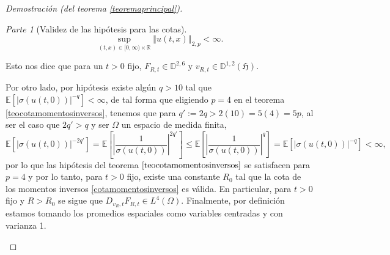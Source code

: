 \documentclass[letterpaper,twoside,12pt]{book}
\newcommand{\R}{\mathbb{R}}
\newcommand{\D}{\mathbb{D}}
\newcommand{\E}{\mathbb{E}}
\newcommand{\1}{\mathds{1}}
\newcommand{\abs}[1]{\left\lvert #1 \right\rvert}
\newcommand{\norm}[1]{\left\Vert #1 \right\Vert}
\theoremstyle{definition}
\theoremstyle{definition}
\theoremstyle{remark}
\newtheorem{proofpart}{Parte}
\theoremstyle{definition}
\theoremstyle{definition}
\theoremstyle{definition}
\theoremstyle{definition}
\theoremstyle{definition}
\begin{document}
\begin{proof}[Demostración (del teorema \ref{teoremaprincipal})]
\begin{proofpart}[Validez de las hipótesis para las cotas]
\begin{equation}\label{cotaunif}
      \sup_{(t,x)\in [0,\infty)\times\R}\norm{u(t,x)}_{2,p}<\infty.
\end{equation}

Esto nos dice que para un $t>0$ fijo, $F_{R,t}\in \D^{2,6}$ y $v_{R,t}\in \D^{1,2}(\mathfrak{H})$. 

Por otro lado, por hipótesis existe algún $q>10$ tal que $\E\left[\abs{\sigma(u(t,0))}^{-q}\right]<\infty$, de tal forma que eligiendo $p=4$ en el teorema \ref{teocotamomentosinversos}, tenemos que para $q':=2q>2(10)=5(4)=5p$, al ser el caso que $2q'>q$ y ser $\Omega$ un espacio de medida finita, 
\[
\E\left[\abs{\sigma(u(t,0))}^{-2q'}\right]=\E\left[\abs{\frac{1}{\sigma(u(t,0))}}^{2q'}\right]\leq \E\left[\abs{\frac{1}{\sigma(u(t,0))}}^{q}\right]=\E\left[\abs{\sigma(u(t,0))}^{-q}\right]<\infty,
\]
por lo que las hipótesis del teorema $\ref{teocotamomentosinversos}$ se satisfacen para $p=4$ y por lo tanto, para $t>0$ fijo, existe una constante $R_0$ tal que la cota de los momentos inversos \eqref{cotamomentosinversos} es válida. En particular, para $t>0$ fijo y $R>R_0$ se sigue que $D_{v_R,t}F_{R,t}\in L^{4}(\Omega)$. Finalmente, por definición estamos tomando los promedios espaciales como variables centradas y con varianza 1. 


\end{proofpart}
\end{proof}
\end{document}
